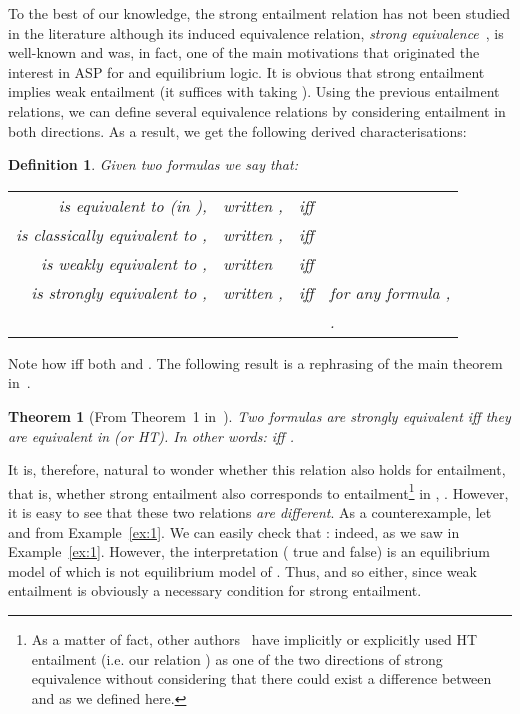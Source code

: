\documentclass{tlp}
\def\qed{~\hfill}
\newtheorem{definition}{Definition}
\newtheorem{theorem}{Theorem}
\begin{document}
To the best of our knowledge, the strong entailment relation has not been studied in the literature although its induced equivalence relation, \emph{strong equivalence}~\cite{LPV01}, is well-known and was, in fact, one of the main motivations that originated the interest in ASP for  and equilibrium logic. It is obvious that strong entailment implies weak entailment (it suffices with taking ). Using the previous entailment relations, we can define several equivalence relations by considering entailment in both directions. As a result, we get the following derived characterisations:

\begin{definition}
Given two formulas  we say that:

\begin{tabular}{rl@{\!}c@{\!}l}
 is \emph{equivalent} to  (in ), & written , & iff & \\
 is \emph{classically equivalent} to , & written , & iff & \\
 is \emph{weakly equivalent} to , & written  & iff & \\
 is \emph{strongly equivalent} to , & written , & iff & for any formula , \\
& & & . \qed
\end{tabular}
\end{definition}

Note how  iff both  and . The following result is a rephrasing of the main theorem in~\cite{LPV01}.

\begin{theorem}[From Theorem~1 in~\cite{LPV01}]\label{th:se}
Two formulas  are strongly equivalent iff they are equivalent in  (or HT). In other words:  iff .\qed
\end{theorem}

It is, therefore, natural to wonder whether this relation also holds for entailment, that is, whether strong entailment  also corresponds to entailment\footnote{As a matter of fact, other authors~\cite{DSTW08,SL14} have implicitly or explicitly used HT entailment (i.e. our  relation ) as one of the two directions of strong equivalence without considering that there could exist a difference between  and  as we defined here.} in , .  However, it is easy to see that these two relations \emph{are different}. As a counterexample, let  and  from Example~\ref{ex:1}. We can easily check that : indeed,   as we saw in Example~\ref{ex:1}. However, the interpretation  ( true and  false) is an equilibrium model of  which is not equilibrium model of . Thus,  and so  either, since weak entailment is obviously a necessary condition for strong entailment.
\end{document}
